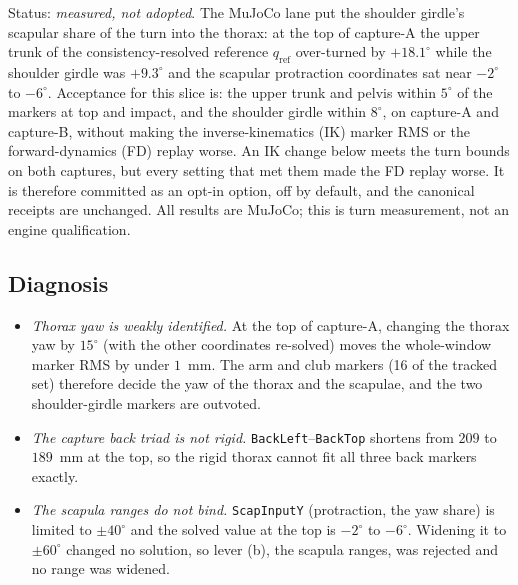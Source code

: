 \documentclass[11pt,a4paper]{article}
\begin{document}
Status: \emph{measured, not adopted}. The MuJoCo lane put the shoulder girdle's scapular share of the turn into the thorax: at the top of capture-A the upper trunk of the consistency-resolved reference $q_{\mathrm{ref}}$ over-turned by $+18.1^\circ$ while the shoulder girdle was $+9.3^\circ$ and the scapular protraction coordinates sat near $-2^\circ$ to $-6^\circ$. Acceptance for this slice is: the upper trunk and pelvis within $5^\circ$ of the markers at top and impact, and the shoulder girdle within $8^\circ$, on capture-A and capture-B, without making the inverse-kinematics (IK) marker RMS or the forward-dynamics (FD) replay worse. An IK change below meets the turn bounds on both captures, but every setting that met them made the FD replay worse. It is therefore committed as an opt-in option, off by default, and the canonical receipts are unchanged. All results are MuJoCo; this is turn measurement, not an engine qualification.

\subsection{Diagnosis}
\begin{itemize}
\item \emph{Thorax yaw is weakly identified.} At the top of capture-A, changing the thorax yaw by $15^\circ$ (with the other coordinates re-solved) moves the whole-window marker RMS by under $1$~mm. The arm and club markers (16 of the tracked set) therefore decide the yaw of the thorax and the scapulae, and the two shoulder-girdle markers are outvoted.
\item \emph{The capture back triad is not rigid.} \texttt{BackLeft}--\texttt{BackTop} shortens from $209$ to $189$~mm at the top, so the rigid thorax cannot fit all three back markers exactly.
\item \emph{The scapula ranges do not bind.} \texttt{ScapInputY} (protraction, the yaw share) is limited to $\pm40^\circ$ and the solved value at the top is $-2^\circ$ to $-6^\circ$. Widening it to $\pm60^\circ$ changed no solution, so lever (b), the scapula ranges, was rejected and no range was widened.
\end{itemize}
\end{document}
